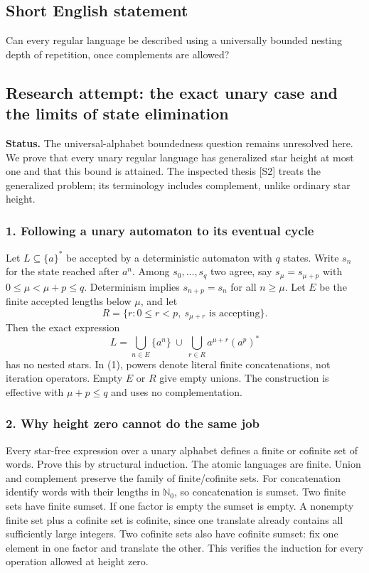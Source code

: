 \documentclass[11pt,a4paper]{article}
\begin{document}
\subsection{Short English statement}

Can every regular language be described using a universally bounded nesting depth of repetition, once complements are allowed?

\subsection{Research attempt: the exact unary case and the limits of state elimination}
\textbf{Status.} The universal-alphabet boundedness question remains unresolved here. We prove that every unary regular language has generalized star height at most one and that this bound is attained. The inspected thesis [S2] treats the generalized problem; its terminology includes complement, unlike ordinary star height.

\subsubsection{1. Following a unary automaton to its eventual cycle}
Let $L\subseteq\{a\}^*$ be accepted by a deterministic automaton with $q$ states. Write $s_n$ for the state reached after $a^n$. Among $s_0,\ldots,s_q$ two agree, say $s_\mu=s_{\mu+p}$ with $0\leq\mu<\mu+p\leq q$. Determinism implies $s_{n+p}=s_n$ for all $n\geq\mu$. Let $E$ be the finite accepted lengths below $\mu$, and let
\[R=\{r:0\leq r<p,\ s_{\mu+r}\text{ is accepting}\}.\]
Then the exact expression
\[L=\bigcup_{n\in E}\{a^n\}\ \cup\
\bigcup_{r\in R} a^{\mu+r}(a^p)^*\tag{1}\]
has no nested stars. In (1), powers denote literal finite concatenations, not iteration operators. Empty $E$ or $R$ give empty unions. The construction is effective with $\mu+p\leq q$ and uses no complementation.

\subsubsection{2. Why height zero cannot do the same job}
Every star-free expression over a unary alphabet defines a finite or cofinite set of words. Prove this by structural induction. The atomic languages are finite. Union and complement preserve the family of finite/cofinite sets. For concatenation identify words with their lengths in $\mathbb N_0$, so concatenation is sumset. Two finite sets have finite sumset. If one factor is empty the sumset is empty. A nonempty finite set plus a cofinite set is cofinite, since one translate already contains all sufficiently large integers. Two cofinite sets also have cofinite sumset: fix one element in one factor and translate the other. This verifies the induction for every operation allowed at height zero.
\end{document}
